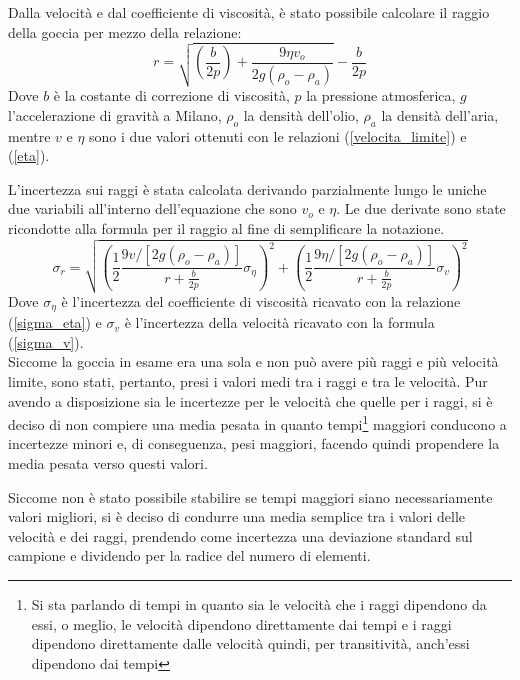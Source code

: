\documentclass{article}
\begin{document}
Dalla velocità e dal coefficiente di viscosità, è stato possibile calcolare il raggio della goccia per mezzo della relazione:
\begin{equation}
	r=\sqrt{\left(\frac{b}{2p}\right)+\frac{9\eta v_o}{2g(\rho_o-\rho_a)}}-\frac b{2p}
	\label{raggio}
\end{equation}
Dove $b$ è la costante di correzione di viscosità, $p$ la pressione atmosferica, $g$ l'accelerazione di gravità a Milano, $\rho_o$ la densità dell'olio, $\rho_a$ la densità dell'aria, mentre $v$ e $\eta$ sono i due valori ottenuti con le relazioni (\ref{velocita_limite}) e (\ref{eta}).

L'incertezza sui raggi è stata calcolata derivando parzialmente lungo le uniche due variabili all'interno dell'equazione che sono $v_o$ e $\eta$. Le due derivate sono state ricondotte alla formula per il raggio al fine di semplificare la notazione.
\begin{equation}
	\sigma_r=\sqrt{\left(\frac12\frac{9v/[2g(\rho_o-\rho_a)]}{r+\frac b{2p}}\sigma_{\eta}\right)^2+\left(\frac12\frac{9\eta/[2g(\rho_o-\rho_a)]}{r+\frac b{2p}}\sigma_v\right)^2}
\end{equation}
Dove $\sigma_{\eta}$ è l'incertezza del coefficiente di viscosità ricavato con la relazione (\ref{sigma_eta}) e $\sigma_v$ è l'incertezza della velocità ricavato con la formula (\ref{sigma_v}).\\

Siccome la goccia in esame era una sola e non può avere più raggi e più velocità limite, sono stati, pertanto, presi i valori medi tra i raggi e tra le velocità. Pur avendo a disposizione sia le incertezze per le velocità che quelle per i raggi, si è deciso di non compiere una media pesata in quanto tempi\footnote{Si sta parlando di tempi in quanto sia le velocità che i raggi dipendono da essi, o meglio, le velocità dipendono direttamente dai tempi e i raggi dipendono direttamente dalle velocità quindi, per transitività, anch'essi dipendono dai tempi} maggiori conducono a incertezze minori e, di conseguenza, pesi maggiori, facendo quindi propendere la media pesata verso questi valori.

Siccome non è stato possibile stabilire se tempi maggiori siano necessariamente valori migliori, si è deciso di condurre una media semplice tra i valori delle velocità e dei raggi, prendendo come incertezza una deviazione standard sul campione e dividendo per la radice del numero di elementi.\\
\end{document}
